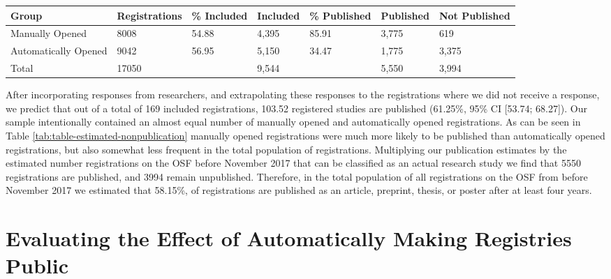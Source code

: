 \documentclass[
  ,jou, a4paper,floatsintext]{apa6}
\begin{document}
\begin{table*}[tbp]

\begin{center}
\begin{threeparttable}

\caption{\label{tab:table-estimated-nonpublication}Estimated number of published and unpublished studies registered on the OSF before November 2017.}

\begin{tabular}{lllllll}
\toprule
Group & \multicolumn{1}{c}{Registrations} & \multicolumn{1}{c}{\% Included} & \multicolumn{1}{c}{Included} & \multicolumn{1}{c}{\% Published} & \multicolumn{1}{c}{Published} & \multicolumn{1}{c}{Not Published}\\
\midrule
Manually Opened & 8008 & 54.88 & 4,395 & 85.91 & 3,775 & 619\\
Automatically Opened & 9042 & 56.95 & 5,150 & 34.47 & 1,775 & 3,375\\
Total & 17050 &  & 9,544 &  & 5,550 & 3,994\\
\bottomrule
\end{tabular}

\end{threeparttable}
\end{center}

\end{table*}

After incorporating responses from researchers, and extrapolating these responses to the registrations where we did not receive a response, we predict that out of a total of 169 included registrations, 103.52 registered studies are published (61.25\%, 95\% CI {[}53.74; 68.27{]}). Our sample intentionally contained an almost equal number of manually opened and automatically opened registrations. As can be seen in Table \ref{tab:table-estimated-nonpublication} manually opened registrations were much more likely to be published than automatically opened registrations, but also somewhat less frequent in the total population of registrations. Multiplying our publication estimates by the estimated number registrations on the OSF before November 2017 that can be classified as an actual research study we find that 5550 registrations are published, and 3994 remain unpublished. Therefore, in the total population of all registrations on the OSF from before November 2017 we estimated that 58.15\%, of registrations are published as an article, preprint, thesis, or poster after at least four years.

\hypertarget{evaluating-the-effect-of-automatically-making-registries-public}{%
\section{Evaluating the Effect of Automatically Making Registries Public}\label{evaluating-the-effect-of-automatically-making-registries-public}}
\end{document}
